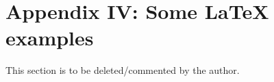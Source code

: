 \centering
{}

\clearpage  %
\section*{Appendix IV: Some \LaTeX{} examples}

This section is to be deleted/commented by the author.
